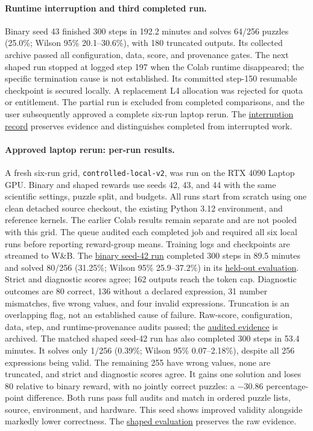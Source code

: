 \documentclass[11pt]{article}
\begin{document}
\paragraph{Runtime interruption and third completed run.}
Binary seed 43 finished 300 steps in 192.2 minutes and solves 64/256 puzzles
(25.0\%; Wilson 95\% 20.1--30.6\%), with 180 truncated outputs. Its collected
archive passed all configuration, data, score, and provenance gates. The next
shaped run stopped at logged step 197 when the Colab runtime disappeared; the
specific termination cause is not established. Its committed step-150 resumable
checkpoint is secured locally. A replacement L4 allocation was rejected for
quota or entitlement. The partial run is excluded from completed comparisons,
and the user subsequently approved a complete six-run laptop rerun. The
\href{https://github.com/mohamedsobhi777/countdown-grpo/tree/main/results/study/runtime-interruption}{interruption record}
preserves evidence and distinguishes completed from interrupted work.

\paragraph{Approved laptop rerun: per-run results.}
A fresh six-run grid, \texttt{controlled-local-v2}, was run on the RTX 4090
Laptop GPU. Binary and shaped rewards use seeds 42, 43, and 44 with the same
scientific settings, puzzle split, and budgets. All runs start from scratch using
one clean detached source checkout, the existing Python 3.12 environment, and
reference kernels. The earlier Colab results remain separate and are not pooled
with this grid. The queue audited each completed job and required all six local
runs before reporting reward-group means. Training logs and checkpoints are
streamed to W\&B. The
\href{https://wandb.ai/mohamedsobhi777/countdown-grpo/runs/eudebo7g}{binary seed-42 run}
completed 300 steps in 89.5 minutes and solved 80/256 (31.25\%; Wilson 95\%
25.9--37.2\%) in its
\href{https://wandb.ai/mohamedsobhi777/countdown-grpo/runs/17gdgf7i}{held-out evaluation}.
Strict and diagnostic scores agree; 162 outputs reach the token cap. Diagnostic
outcomes are 80 correct, 136 without a declared expression, 31 number mismatches,
five wrong values, and four invalid expressions. Truncation is an overlapping
flag, not an established cause of failure. Raw-score, configuration, data, step,
and runtime-provenance audits passed; the
\href{https://wandb.ai/mohamedsobhi777/countdown-grpo/runs/judanvdy}{audited evidence}
is archived. The matched shaped seed-42 run has also completed 300 steps in
53.4 minutes. It solves only 1/256 (0.39\%; Wilson 95\% 0.07--2.18\%), despite
all 256 expressions being valid. The remaining 255 have wrong values, none
are truncated, and strict and diagnostic scores agree. It gains one solution
and loses 80 relative to binary reward, with no jointly correct puzzles:
a $-30.86$ percentage-point difference. Both runs pass full audits and match
in ordered puzzle lists, source, environment, and hardware. This seed shows
improved validity alongside markedly lower correctness. The
\href{https://wandb.ai/mohamedsobhi777/countdown-grpo/runs/8694c6tk}{shaped evaluation}
preserves the raw evidence.
\end{document}
